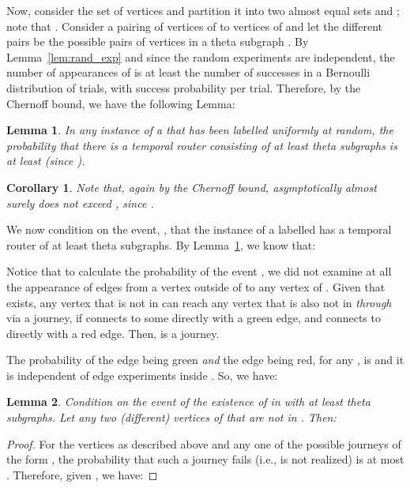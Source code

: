\documentclass[a4paper,UKenglish]{article}
\newtheorem{lemma}{Lemma}
\newtheorem{corollary}{Corollary}
\begin{document}
Now, consider the set of vertices  and partition it into two almost equal sets  and ; note that . Consider a pairing of  vertices of  to  vertices of  and let the  different pairs be the possible pairs of vertices  in a theta subgraph . By Lemma~\ref{lem:rand_exp} and since the random experiments are independent, the number of appearances of  is at least the number of successes in a Bernoulli distribution of  trials, with success probability  per trial. Therefore, by the Chernoff bound, we have the following Lemma:
\begin{lemma}\label{lem:prob_theta_sub}
In any instance  of a  that has been labelled uniformly at random, the probability that there is a temporal router  consisting of at least  theta subgraphs  is at least  (since ).
\end{lemma}

\begin{corollary}
Note that, again by the Chernoff bound,  asymptotically almost surely \emph{does not exceed} , since .
\end{corollary}

We now condition on the event, , that the instance  of a labelled  has a temporal router  of at least  theta subgraphs. By Lemma~\ref{lem:prob_theta_sub}, we know that:

Notice that to calculate the probability of the event , we did not examine at all the appearance of edges from a vertex outside of  to any vertex of . Given that  exists, any vertex  that is not in  can reach any vertex  that is also not in  \emph{through } via a journey, if  connects to some  directly with a green edge, and   connects to  directly with a red edge. Then,  is a journey.

The probability of the edge  being green \emph{and} the edge  being red, for any , is  and it is independent of edge experiments inside . So, we have:

\begin{lemma}
Condition on the event  of the existence of  in  with at least  theta subgraphs. Let  any two (different) vertices of  that are not in . Then:

\end{lemma}
\begin{proof}
For the vertices  as described above and any one of the  possible journeys of the form , the probability that such a journey fails (i.e., is not realized) is at most . Therefore, given , we have:

\end{proof}
\end{document}
